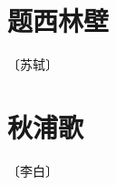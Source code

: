 \documentclass[12pt,UTF-8,openany]{ctexbook}
\begin{document}
\vspace{8pt}


\section{题西林壁}

\begin{center}
    \vspace{10pt}
    
    \begin{normalsize}
        
        〔苏轼〕
        
    \end{normalsize}
    
    \vspace{8pt}
    
    \begin{large}
        
        
        
    \end{large}
    
\end{center}

\vspace{8pt}


\section{秋浦歌}

\begin{center}
    \vspace{10pt}
    
    \begin{normalsize}
        
        〔李白〕
        
    \end{normalsize}
    
    \vspace{8pt}
    
    \begin{large}
        
        
        
    \end{large}
    
\end{center}
\end{document}
